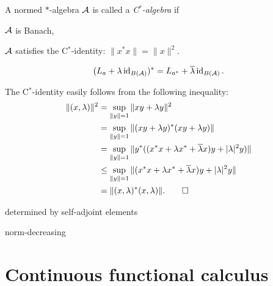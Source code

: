 \documentclass{../../large}
\begin{document}
\begin{prb}[C$^*$ identity]
A normed $*$-algebra $\cA$ is called a \emph{C$^*$-algebra} if
\begin{parts}
\item $\cA$ is Banach,
\item $\cA$ satisfies the C$^*$-identity: $\|x^*x\|=\|x\|^2$.
\end{parts}
\end{prb}


\begin{prb}
\[(L_a+\lambda\id_{B(\cA)})^*=L_{a^*}+\bar\lambda\id_{B(\cA)}.\]
\end{prb}
\begin{pf}
The C$^*$-identity easily follows from the following inequality:
\begin{align*}
\|(x,\lambda)\|^2&=\sup_{\|y\|=1}\|xy+\lambda y\|^2\\
&=\sup_{\|y\|=1}\|(xy+\lambda y)^*(xy+\lambda y)\|\\
&=\sup_{\|y\|=1}\|y^*((x^*x+\lambda x^*+\bar\lambda x)y+|\lambda|^2y)\|\\
&\le\sup_{\|y\|=1}\|(x^*x+\lambda x^*+\bar\lambda x)y+|\lambda|^2y\|\\
&=\|(x,\lambda)^*(x,\lambda)\|.\qedhere
\end{align*}
\end{pf}




\begin{prb}[$*$-homomorphisms]
\begin{parts}
\item determined by self-adjoint elements
\item norm-decreasing
\item
\end{parts}
\end{prb}


\section{Continuous functional calculus}
\end{document}
